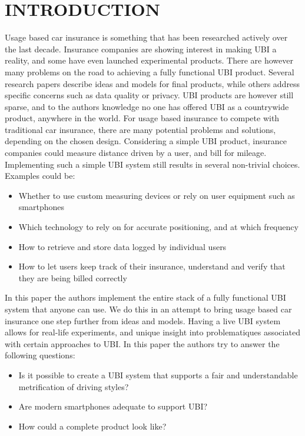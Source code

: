 \section{INTRODUCTION}\label{sec:intro}
Usage based car insurance is something that has been researched actively over the last decade. Insurance companies are showing interest in making UBI a reality, and some have even launched experimental products\citep{qbe_ubi}\citep{progressive_ubi}\citep{allstate_ubi}. There are however many problems on the road to achieving a fully functional UBI product. Several research papers describe ideas and models for final products, while others address specific concerns such as data quality\citep{art:insurtelematics} or privacy\citep{art:pripayd}. UBI products are however still sparse, and to the authors knowledge no one has offered UBI as a countrywide product, anywhere in the world.
For usage based insurance to compete with traditional car insurance, there are many potential problems and solutions, depending on the chosen design. Considering a simple UBI product, insurance companies could measure distance driven by a user, and bill for mileage. Implementing such a simple UBI system still results in several non-trivial choices. Examples could be:

\begin{itemize}
\item Whether to use custom measuring devices or rely on user equipment such as smartphones
\item Which technology to rely on for accurate positioning, and at which frequency
\item How to retrieve and store data logged by individual users
\item How to let users keep track of their insurance, understand and verify that they are being billed correctly
\end{itemize}

In this paper the authors implement the entire stack of a fully functional UBI system that anyone can use. We do this in an attempt to bring usage based car insurance one step further from ideas and models. Having a live UBI system allows for real-life experiments, and unique insight into problematiques associated with certain approaches to UBI. In this paper the authors try to answer the following questions:

\begin{itemize}
\item Is it possible to create a UBI system that supports a fair and understandable metrification of driving styles?
\item Are modern smartphones adequate to support UBI?
\item How could a complete product look like?
\end{itemize}

